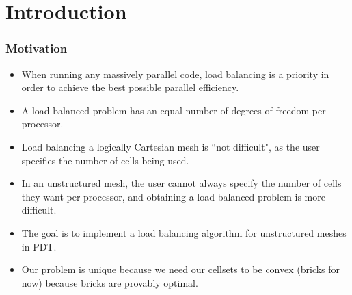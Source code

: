 \documentclass[compress]{beamer}
\begin{document}
\begin{frame}
\tableofcontents
\end{frame}

\section{Introduction}
\begin{frame}[t]\frametitle{Motivation}
	\begin{block}{}
	\begin{itemize}
		\item When running any massively parallel code, load balancing is a priority in order to achieve the best possible parallel efficiency.
		\item  A load balanced problem has an equal number of degrees of freedom per processor.
		\item Load balancing a logically Cartesian mesh is ``not difficult", as the user specifies the number of cells being used.
		\item In an unstructured mesh, the user cannot always specify the number of cells they want per processor, and obtaining a load balanced problem is more difficult.
		\item The goal is to implement a load balancing algorithm for unstructured meshes in PDT.
		\item Our problem is unique because we need our cellsets to be convex (bricks for now) because bricks are provably optimal.
	\end{itemize}
	\end{block}
\end{frame}
\end{document}
